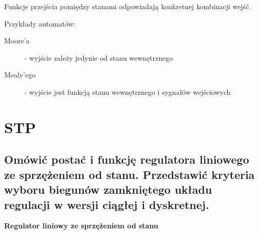 Funkcje przejścia pomiędzy stanami odpowiadają konkretnej kombinacji wejść.

Przykłady automatów:
\begin{description}
    \item[Moore'a] - wyjście zależy jedynie od stanu wewnętrznego
    \item[Mealy'ego] - wyjście jest funkcją stanu wewnętrznego i sygnałów wejściowych
\end{description}

\section{STP}
\subsection{Omówić postać i funkcję regulatora liniowego ze sprzężeniem od stanu. Przedstawić kryteria wyboru biegunów zamkniętego układu regulacji w wersji ciągłej i dyskretnej.}
\textbf{Regulator liniowy ze sprzężeniem od stanu}
